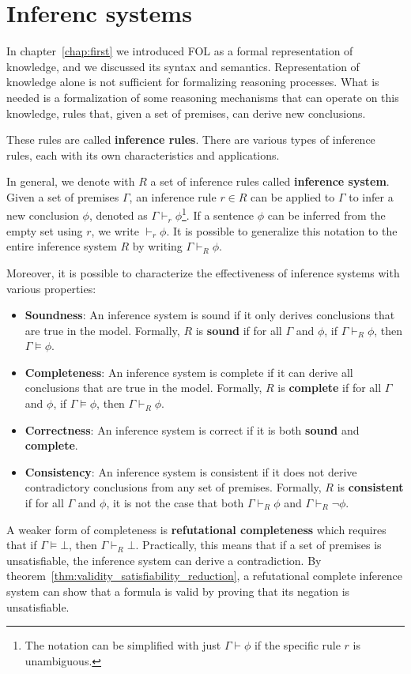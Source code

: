 \chapter{Inferenc systems}\label{chap:second}

In chapter~\ref{chap:first} we introduced FOL as a formal representation of knowledge, and we discussed its syntax and semantics.
Representation of knowledge alone is not sufficient for formalizing reasoning processes.
What is needed is a formalization of some reasoning mechanisms that can operate on this knowledge, rules that, given a set of premises, can derive new conclusions.

These rules are called \textbf{inference rules}.
There are various types of inference rules, each with its own characteristics and applications.

In general, we denote with \(R\) a set of inference rules called \textbf{inference system}. Given a set of premises \(\Gamma\), an inference rule \(r \in R\) can be applied to \(\Gamma\) to infer a new conclusion \(\phi\), denoted as \(\Gamma \vdash_r \phi\)\footnote{
  The notation can be simplified with just \(\Gamma \vdash \phi\) if the specific rule \(r\) is unambiguous.}.
If a sentence \(\phi\) can be inferred from the empty set using \(r\), we write \(\vdash_r \phi\).
It is possible to generalize this notation to the entire inference system \(R\) by writing \(\Gamma \vdash_{R} \phi\).

Moreover, it is possible to characterize the effectiveness of inference systems with various properties:

\begin{itemize}
    \item \textbf{Soundness}: An inference system is sound if it only derives conclusions that are true in the model. Formally, \(R\) is \textbf{sound} if for all \(\Gamma\) and \(\phi\), if \(\Gamma \vdash_{R} \phi\), then \(\Gamma\models\phi\).
    \item \textbf{Completeness}: An inference system is complete if it can derive all conclusions that are true in the model. Formally, \(R\) is \textbf{complete} if for all \(\Gamma\) and \(\phi\), if \(\Gamma\models\phi\), then \(\Gamma \vdash_{R} \phi\).
    \item \textbf{Correctness}: An inference system is correct if it is both \textbf{sound} and \textbf{complete}.
    \item \textbf{Consistency}: An inference system is consistent if it does not derive contradictory conclusions from any set of premises. Formally, \(R\) is \textbf{consistent} if for all \(\Gamma\) and \(\phi\), it is not the case that both \(\Gamma \vdash_{R} \phi\) and \(\Gamma \vdash_{R} \neg \phi\).
\end{itemize}
A weaker form of completeness is \textbf{refutational completeness} which requires that if \(\Gamma \models \bot\), then \(\Gamma \vdash_{R} \bot\).  Practically, this means that if a set of premises is unsatisfiable, the inference system can derive a contradiction.
By theorem~\ref{thm:validity_satisfiability_reduction}, a refutational complete inference system can show that a formula is valid by proving that its negation is unsatisfiable.

